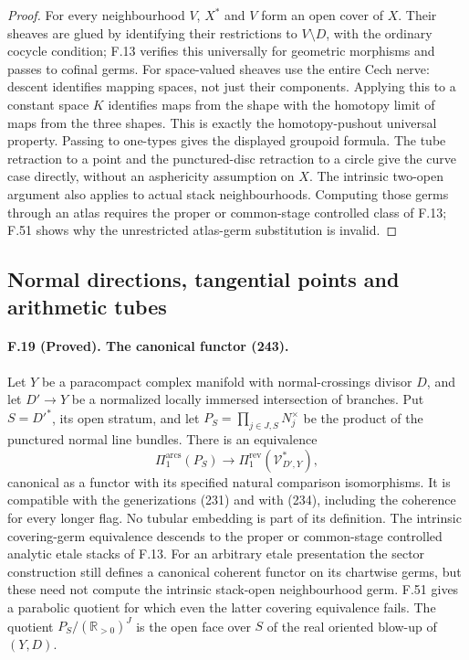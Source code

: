 \begin{proof}
For every neighbourhood $V$, $X^*$ and $V$ form an open cover of $X$.
Their sheaves are glued by identifying their restrictions to
$V\setminus D$, with the ordinary cocycle condition; F.13 verifies
this universally for geometric morphisms and passes to cofinal germs.
For space-valued sheaves use the entire Cech nerve: descent identifies
mapping spaces, not just their components. Applying this to a constant
space $K$ identifies maps from the shape with the homotopy limit of
maps from the three shapes. This is exactly the homotopy-pushout
universal property. Passing to one-types gives the displayed groupoid
formula. The tube retraction to a point and the punctured-disc
retraction to a circle give the curve case directly, without an
asphericity assumption on $X$. The intrinsic two-open argument also
applies to actual stack neighbourhoods. Computing those germs through
an atlas requires the proper or common-stage controlled class of F.13;
F.51 shows why the unrestricted atlas-germ substitution is invalid.
\end{proof}

\subsection{Normal directions, tangential points and arithmetic tubes}

\paragraph{F.19 (Proved). The canonical functor (243).}
Let $Y$ be a paracompact complex manifold with normal-crossings divisor
$D$, and let $D'\to Y$ be a normalized locally immersed intersection
of branches. Put $S=D'^*$, its open stratum, and let
$P_S=\prod_{j\in J,S}N_j^\times$ be the product of the punctured
normal line bundles. There is an equivalence
\[
 \Pi_1^{\mathrm{arcs}}(P_S)\longrightarrow
 \Pi_1^{\mathrm{rev}}(\mathcal V^*_{D',Y}),
\]
canonical as a functor with its specified natural comparison
isomorphisms. It is compatible with the generizations (231) and with
(234), including the coherence for every longer flag. No tubular
embedding is part of its definition. The intrinsic covering-germ
equivalence descends to the proper or common-stage controlled analytic
etale stacks of F.13. For an arbitrary etale presentation the sector
construction still defines a canonical coherent functor on its
chartwise germs, but these need not compute the intrinsic stack-open
neighbourhood germ. F.51 gives a parabolic quotient for which even
the latter covering equivalence fails. The quotient
$P_S/(\mathbb R_{>0})^J$ is the
open face over $S$ of the real oriented blow-up of $(Y,D)$.

